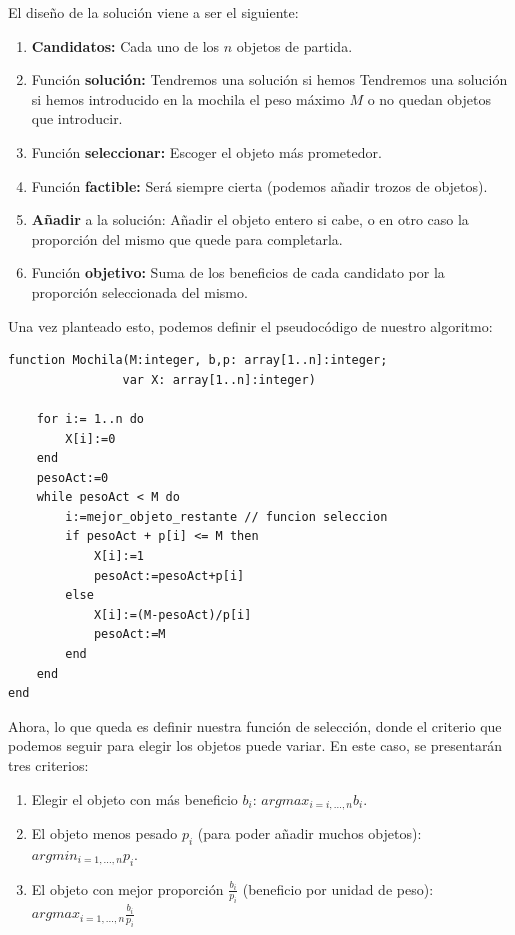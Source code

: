 \documentclass[10pt,a4paper,spanish]{report}
\theoremstyle{definition}
\theoremstyle{remark}
\begin{document}
El diseño de la solución viene a ser el siguiente:
\begin{enumerate}[---]
    \item \textbf{Candidatos:} Cada uno de los $n$ objetos de partida.
    \item Función \textbf{solución:} Tendremos una solución si hemos Tendremos una solución si hemos introducido en la mochila el peso máximo \textbf{$M$} o no quedan objetos que introducir.
    \item Función \textbf{seleccionar:} Escoger el objeto más prometedor.
    \item Función \textbf{factible:} Será siempre cierta (podemos añadir trozos de objetos).
    \item \textbf{Añadir} a la solución: Añadir el objeto entero si cabe, o en otro caso la proporción del mismo que quede para completarla.
    \item Función \textbf{objetivo:} Suma de los beneficios de cada candidato por la proporción seleccionada del mismo.
\end{enumerate}

Una vez planteado esto, podemos definir el pseudocódigo de nuestro algoritmo:

\begin{verbatim}
function Mochila(M:integer, b,p: array[1..n]:integer;
                var X: array[1..n]:integer)

    for i:= 1..n do
        X[i]:=0
    end
    pesoAct:=0
    while pesoAct < M do
        i:=mejor_objeto_restante // funcion seleccion
        if pesoAct + p[i] <= M then
            X[i]:=1
            pesoAct:=pesoAct+p[i]
        else
            X[i]:=(M-pesoAct)/p[i]
            pesoAct:=M
        end
    end
end
\end{verbatim}

Ahora, lo que queda es definir nuestra función de selección, donde el criterio que podemos seguir para elegir los objetos puede variar. En este caso, se presentarán tres criterios:

\begin{enumerate}
    \item Elegir el objeto con más beneficio $b_i$: $argmax_{i=i,\ldots,n}b_i$.
    \item El objeto menos pesado $p_i$ (para poder añadir muchos objetos): $argmin_{i=1,\ldots,n}p_i$.
    \item El objeto con mejor proporción $\frac{b_i}{p_i}$ (beneficio por unidad de peso): $argmax_{i=1,\ldots,n}\frac{b_i}{p_i}$
\end{enumerate}
\end{document}
